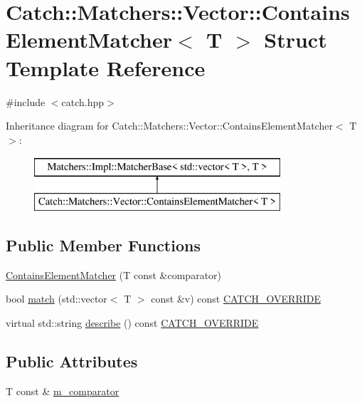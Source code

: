 \hypertarget{structCatch_1_1Matchers_1_1Vector_1_1ContainsElementMatcher}{\section{Catch\-:\-:Matchers\-:\-:Vector\-:\-:Contains\-Element\-Matcher$<$ T $>$ Struct Template Reference}
\label{structCatch_1_1Matchers_1_1Vector_1_1ContainsElementMatcher}
}


{\ttfamily \#include $<$catch.\-hpp$>$}

Inheritance diagram for Catch\-:\-:Matchers\-:\-:Vector\-:\-:Contains\-Element\-Matcher$<$ T $>$\-:\begin{figure}[H]
\begin{center}
\leavevmode
\includegraphics[height=2.000000cm]{structCatch_1_1Matchers_1_1Vector_1_1ContainsElementMatcher}
\end{center}
\end{figure}
\subsection*{Public Member Functions}
\begin{DoxyCompactItemize}
\item 
\hyperlink{structCatch_1_1Matchers_1_1Vector_1_1ContainsElementMatcher_a6a05740b5d3f89fac8de84ac0cff7b93}{Contains\-Element\-Matcher} (T const \&comparator)
\item 
bool \hyperlink{structCatch_1_1Matchers_1_1Vector_1_1ContainsElementMatcher_a95fd99879bcfbe129898bef922c92c17}{match} (std\-::vector$<$ T $>$ const \&v) const \hyperlink{catch_8hpp_a8ecdce4d3f57835f707915ae831eb847}{C\-A\-T\-C\-H\-\_\-\-O\-V\-E\-R\-R\-I\-D\-E}
\item 
virtual std\-::string \hyperlink{structCatch_1_1Matchers_1_1Vector_1_1ContainsElementMatcher_a5a869772714dd045816707b74b217664}{describe} () const \hyperlink{catch_8hpp_a8ecdce4d3f57835f707915ae831eb847}{C\-A\-T\-C\-H\-\_\-\-O\-V\-E\-R\-R\-I\-D\-E}
\end{DoxyCompactItemize}
\subsection*{Public Attributes}
\begin{DoxyCompactItemize}
\item 
T const \& \hyperlink{structCatch_1_1Matchers_1_1Vector_1_1ContainsElementMatcher_ab7eada6c4bbce1d21b44773262f9cb23}{m\-\_\-comparator}
\end{DoxyCompactItemize}


